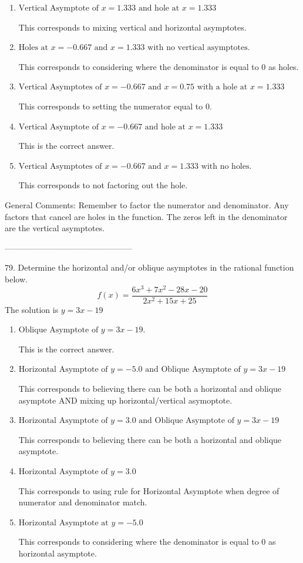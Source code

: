 \documentclass{extbook}[14pt]
\begin{document}
\begin{enumerate}[label=\Alph*.] 
\item $ \text{Vertical Asymptote of } x = 1.333 \text{ and hole at } x = 1.333 $ 

 This corresponds to mixing vertical and horizontal asymptotes. 
\item $ \text{Holes at } x = -0.667 \text{ and } x = 1.333 \text{ with no vertical asymptotes.} $ 

 This corresponds to considering where the denominator is equal to 0 as holes. 
\item $ \text{Vertical Asymptotes of } x = -0.667 \text{ and } x = 0.75 \text{ with a hole at } x = 1.333 $ 

 This corresponds to setting the numerator equal to 0. 
\item $ \text{Vertical Asymptote of } x = -0.667 \text{ and hole at } x = 1.333 $ 

 This is the correct answer. 
\item $ \text{Vertical Asymptotes of } x = -0.667 \text{ and } x = 1.333 \text{ with no holes.} $ 

 This corresponds to not factoring out the hole. 
\end{enumerate} 
 
General Comments: Remember to factor the numerator and denominator. Any factors that cancel are holes in the function. The zeros left in the denominator are the vertical asymptotes.

-----------------------------------------------

79. Determine the horizontal and/or oblique asymptotes in the rational function below.
\[ f(x) = \frac{6x^{3} +7 x^{2} -28 x -20}{2x^{2} +15 x + 25} \] 
The solution is $ y = 3x -19 $ 

\begin{enumerate}[label=\Alph*.] 
\item $ \text{Oblique Asymptote of } y = 3x -19. $ 

 This is the correct answer. 
\item $ \text{Horizontal Asymptote of } y = -5.0 \text{ and Oblique Asymptote of } y = 3x -19 $ 

 This corresponds to believing there can be both a horizontal and oblique asymptote AND mixing up horizontal/vertical asymoptote. 
\item $ \text{Horizontal Asymptote of } y = 3.0 \text{ and Oblique Asymptote of } y = 3x -19 $ 

 This corresponds to believing there can be both a horizontal and oblique asymptote. 
\item $ \text{Horizontal Asymptote of } y = 3.0  $ 

 This corresponds to using rule for Horizontal Asymptote when degree of numerator and denominator match. 
\item $ \text{Horizontal Asymptote at } y = -5.0 $ 

 This corresponds to considering where the denominator is equal to 0 as horizontal asymptote. 
\end{enumerate} 
 
\end{document}
